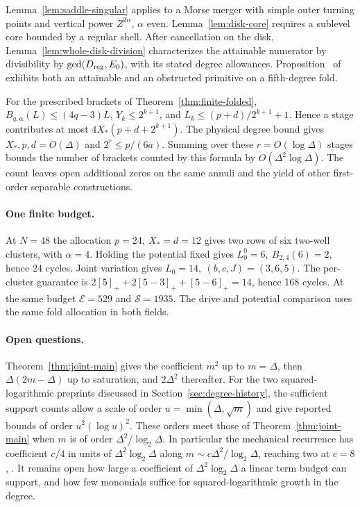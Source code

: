 \begin{remark}\label{rem:portability}
Lemma~\ref{lem:saddle-singular} applies to a Morse merger with simple outer turning points and vertical power \(Z^{2\alpha}\), \(\alpha\) even. Lemma~\ref{lem:disk-core} requires a sublevel core bounded by a regular shell. After cancellation on the disk, Lemma~\ref{lem:whole-disk-division} characterizes the attainable numerator by divisibility by \(\gcd(D_{\rm reg},E_0)\), with its stated degree allowances. Proposition~ of \cite{LuElectronic} exhibits both an attainable and an obstructed primitive on a fifth-degree fold.

For the prescribed brackets of Theorem~\ref{thm:finite-folded}, \(B_{q,\alpha}(L)\le(4q-3)L\), \(Y_k\le2^{k+1}\), and \(L_k\le(p+d)/2^{k+1}+1\). Hence a stage contributes at most \(4X_*(p+d+2^{k+1})\). The physical degree bound gives \(X_*,p,d=O(\Delta)\) and \(2^r\le p/(6a)\). Summing over these \(r=O(\log\Delta)\) stages bounds the number of brackets counted by this formula by \(O(\Delta^2\log\Delta)\). The count leaves open additional zeros on the same annuli and the yield of other first-order separable constructions.
\end{remark}

\paragraph{One finite budget.}
At \(N=48\) the allocation \(p=24,\ X_*=d=12\) gives two rows of six two-well clusters, with \(\alpha=4\). Holding the potential fixed gives \(L^0_0=6,\ B_{2,4}(6)=2\), hence 24 cycles. Joint variation gives \(L_0=14,\ (b,c,J)=(3,6,5)\). The per-cluster guarantee is \(2[5]_++2[5-3]_++[5-6]_+=14\), hence 168 cycles. At the same budget \(\mathcal E=529\) and \(\mathcal S=1935\). The drive and potential comparison uses the same fold allocation in both fields.

\paragraph{Open questions.}
Theorem~\ref{thm:joint-main} gives the coefficient \(m^2\) up to \(m=\Delta\), then \(\Delta(2m-\Delta)\) up to saturation, and \(2\Delta^2\) thereafter. For the two squared-logarithmic preprints discussed in Section~\ref{sec:degree-history}, the sufficient support counts allow a scale of order \(u=\min(\Delta,\sqrt m)\) and give reported bounds of order \(u^2(\log u)^2\). These orders meet those of Theorem~\ref{thm:joint-main} when \(m\) is of order \(\Delta^2/\log_2\Delta\). In particular the mechanical recurrence has coefficient \(c/4\) in units of \(\Delta^2\log_2\Delta\) along \(m\sim c\Delta^2/\log_2\Delta\), reaching two at \(c=8\) \cite[Proposition~3.3]{LuMechanical}, \cite[\S{}]{LuElectronic}. It remains open how large a coefficient of \(\Delta^2\log_2\Delta\) a linear term budget can support, and how few monomials suffice for squared-logarithmic growth in the degree.
